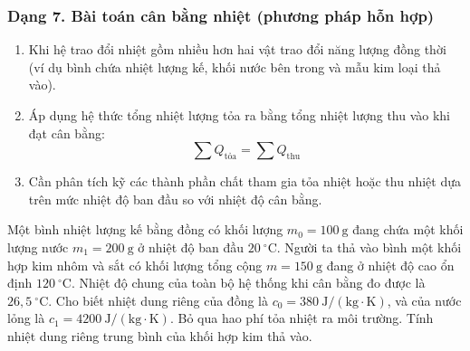 \subsubsection{Dạng 7. Bài toán cân bằng nhiệt (phương pháp hỗn hợp)}

\begin{phuongphap}
\begin{enumerate}
\item Khi hệ trao đổi nhiệt gồm nhiều hơn hai vật trao đổi năng lượng đồng thời (ví dụ bình chứa nhiệt lượng kế, khối nước bên trong và mẫu kim loại thả vào).
\item Áp dụng hệ thức tổng nhiệt lượng tỏa ra bằng tổng nhiệt lượng thu vào khi đạt cân bằng:
\[
\sum Q_{\text{tỏa}} = \sum Q_{\text{thu}}
\]
\item Cần phân tích kỹ các thành phần chất tham gia tỏa nhiệt hoặc thu nhiệt dựa trên mức nhiệt độ ban đầu so với nhiệt độ cân bằng.
\end{enumerate}
\end{phuongphap}
\begin{vidumau}
Một bình nhiệt lượng kế bằng đồng có khối lượng $m_0 = 100\ \mathrm{g}$ đang chứa một khối lượng nước $m_1 = 200\ \mathrm{g}$ ở nhiệt độ ban đầu $20\ ^\circ\mathrm{C}$. Người ta thả vào bình một khối hợp kim nhôm và sắt có khối lượng tổng cộng $m = 150\ \mathrm{g}$ đang ở nhiệt độ cao ổn định $120\ ^\circ\mathrm{C}$. Nhiệt độ chung của toàn bộ hệ thống khi cân bằng đo được là $26{,}5\ ^\circ\mathrm{C}$. Cho biết nhiệt dung riêng của đồng là $c_0 = 380\ \mathrm{J/(kg\cdot K)}$, và của nước lỏng là $c_1 = 4200\ \mathrm{J/(kg\cdot K)}$. Bỏ qua hao phí tỏa nhiệt ra môi trường. Tính nhiệt dung riêng trung bình của khối hợp kim thả vào.
\end{vidumau}

